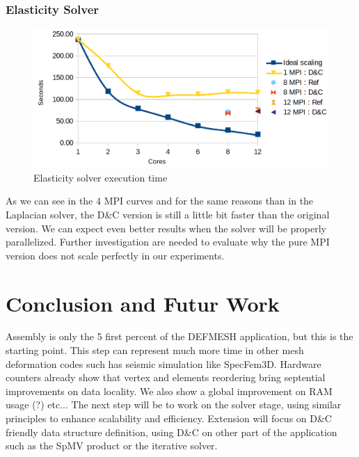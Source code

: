 \documentclass{IOS-Book-Article}
\begin{document}
\subsubsection{Elasticity Solver}
\begin{figure}[htp]
 \centering
 \label{fig9}
 \includegraphics[scale=0.2]{Elasticity_solver_time.png}
 \caption{Elasticity solver execution time}
\end{figure}
As we can see in the 4 MPI curves and for the same reasons than in the Laplacian solver, the D\&C version is still a little bit faster than the original version.
We can expect even better results when the solver will be properly parallelized.
Further investigation are needed to evaluate why the pure MPI version does not scale perfectly in our experiments.

\section{Conclusion and Futur Work}
Assembly is only the 5 first percent of the DEFMESH application, but this is the starting point.
This step can represent much more time in other mesh deformation codes such has seismic simulation like SpecFem3D.
Hardware counters already show that vertex and elements reordering bring septential improvements on data locality.
We also show a global improvement on RAM usage (?) etc...
The next step will be to work on the solver stage, using similar principles to enhance scalability and efficiency.
Extension will focus on D\&C friendly data structure definition, using D\&C on other part of the application such as the SpMV product or the iterative solver. 



\end{document}
